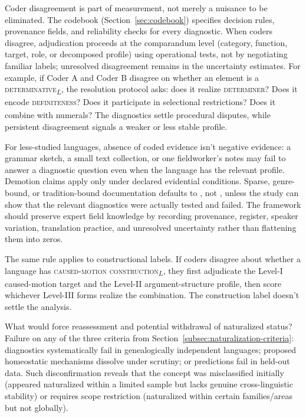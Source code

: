 \documentclass[12pt]{article}
\begin{document}
Coder disagreement is part of measurement, not merely a nuisance to be eliminated. The codebook (Section~\ref{sec:codebook}) specifies decision rules, provenance fields, and reliability checks for every diagnostic. When coders disagree, adjudication proceeds at the comparandum level (category, function, target, role, or decomposed profile) using operational tests, not by negotiating familiar labels; unresolved disagreement remains in the uncertainty estimates. For example, if Coder A and Coder B disagree on whether an element is a \textsc{determinative}\textsubscript{$L$}, the resolution protocol asks: does it realize \textsc{determiner}\textsubscript{\Cross}? Does it encode \textsc{definiteness}\textsubscript{\Cross}? Does it participate in selectional restrictions? Does it combine with numerals? The diagnostics settle procedural disputes, while persistent disagreement signals a weaker or less stable profile.

For less-studied languages, absence of coded evidence isn't negative evidence: a grammar sketch, a small text collection, or one fieldworker's notes may fail to answer a diagnostic question even when the language has the relevant profile. Demotion claims apply only under declared evidential conditions. Sparse, genre-bound, or tradition-bound documentation defaults to , not , unless the study can show that the relevant diagnostics were actually tested and failed. The framework should preserve expert field knowledge by recording provenance, register, speaker variation, translation practice, and unresolved uncertainty rather than flattening them into zeros.

The same rule applies to constructional labels. If coders disagree about whether a language has \textsc{caused-motion construction}\textsubscript{$L$}, they first adjudicate the Level-I caused-motion target and the Level-II argument-structure profile, then score whichever Level-III forms realize the combination. The construction label doesn't settle the analysis.

What would force reassessment and potential withdrawal of naturalized status? Failure on any of the three criteria from Section~\ref{subsec:naturalization-criteria}: diagnostics systematically fail in genealogically independent languages; proposed homeostatic mechanisms dissolve under scrutiny; or predictions fail in held-out data. Such disconfirmation reveals that the concept was misclassified initially (appeared naturalized within a limited sample but lacks genuine cross-linguistic stability) or requires scope restriction (naturalized within certain families/areas but not globally).
\end{document}
